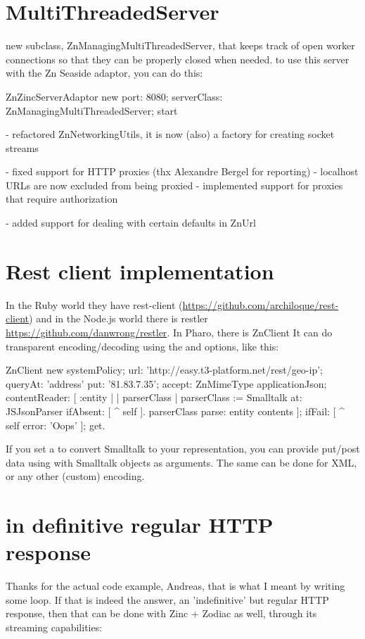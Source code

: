 \documentclass[a4paper,10pt,twoside]{book}
\begin{document}
\section{MultiThreadedServer}      
new subclass, ZnManagingMultiThreadedServer, that keeps track of open
worker connections so that they can be properly closed when needed.
to use this server with the Zn Seaside adaptor, you can do this:

    ZnZincServerAdaptor new
      port: 8080;
      serverClass: ZnManagingMultiThreadedServer;
      start
      
- refactored ZnNetworkingUtils, it is now (also) a factory for creating socket streams


- fixed support for HTTP proxies (thx Alexandre Bergel for reporting)
- localhost URLs are now excluded from being proxied
- implemented support for proxies that require authorization

- added support for dealing with certain defaults in ZnUrl


\section{Rest client implementation}
In the Ruby world they have rest-client (\url{https://github.com/archiloque/rest-client}) and in
the Node.js world there is restler \url{https://github.com/danwrong/restler}. In Pharo, there is ZnClient
It can do transparent encoding/decoding using the  and  options, like this:

\begin{code}
ZnClient new
	systemPolicy;
	url: 'http://easy.t3-platform.net/rest/geo-ip';
	queryAt: 'address' put: '81.83.7.35';
	accept: ZnMimeType applicationJson;
	contentReader: [ :entity | | parserClass |
		parserClass := Smalltalk at:  JSJsonParser ifAbsent: [ ^ self ].
		parserClass parse: entity contents ];
	ifFail: [ ^ self error: 'Oops' ];
	get.
\end{code}	

If you set a  to convert Smalltalk to your representation, you can provide put/post data using  with Smalltalk objects as arguments. The same can be done for XML, or any other (custom) encoding.



\section{in definitive regular HTTP response}
Thanks for the actual code example, Andreas, that is what I meant by writing some loop. If that is indeed the answer, an 'indefinitive' but regular HTTP response, then that can be done with Zinc + Zodiac as well, through its streaming capabilities: 
\end{document}
